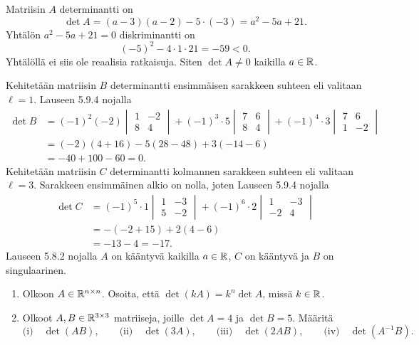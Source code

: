 \documentclass[11pt,a4paper]{amsart}
\begin{document}
\begin{solution}
  Matriisin \(A\) determinantti on
  \[
    \det A=(a-3)(a-2)-5\cdot(-3)=a^2-5a+21.
  \]
  Yhtälön \(a^2-5a+21=0\) diskriminantti on
  \[
    (-5)^2-4\cdot 1\cdot 21=-59<0.
  \]
  Yhtälöllä ei siis ole reaalisia ratkaisuja. Siten \(\det A\ne 0\)
  kaikilla \(a\in\mathbb{R}\).

  Kehitetään matriisin \(B\) determinantti ensimmäisen sarakkeen
  suhteen eli valitaan \(\ell=1\). Lauseen 5.9.4 nojalla
  \[
    \begin{aligned}
      \det B
      &= (-1)^2(-2)
      \begin{vmatrix}1 & -2 \\ 8 & 4
      \end{vmatrix}
      + (-1)^3\cdot 5
      \begin{vmatrix}7 & 6 \\ 8 & 4
      \end{vmatrix}
      + (-1)^4\cdot 3
      \begin{vmatrix}7 & 6 \\ 1 & -2
      \end{vmatrix} \\
      &= (-2)(4+16)-5(28-48)+3(-14-6) \\
      &= -40+100-60=0.
    \end{aligned}
  \]
  Kehitetään matriisin \(C\) determinantti kolmannen sarakkeen
  suhteen eli valitaan \(\ell=3\). Sarakkeen ensimmäinen alkio on
  nolla, joten Lauseen 5.9.4 nojalla
  \[
    \begin{aligned}
      \det C
      &= (-1)^5\cdot 1
      \begin{vmatrix}1 & -3 \\ 5 & -2
      \end{vmatrix}
      + (-1)^6\cdot 2
      \begin{vmatrix}1 & -3 \\ -2 & 4
      \end{vmatrix} \\
      &= -(-2+15)+2(4-6) \\
      &= -13-4=-17.
    \end{aligned}
  \]
  Lauseen 5.8.2 nojalla \(A\) on kääntyvä kaikilla \(a\in\mathbb{R}\),
  \(C\) on kääntyvä ja \(B\) on singulaarinen.
\end{solution}

\begin{exercise}
  \begin{enumerate}[label=(\alph*), leftmargin=*]
    \item Olkoon \(A\in\mathbb{R}^{n\times n}\). Osoita, että
      \(\det(kA)=k^n\det A\), missä \(k\in\mathbb{R}\).
    \item Olkoot \(A,B\in\mathbb{R}^{3\times 3}\) matriiseja, joille
      \(\det A=4\) ja \(\det B=5\). Määritä
      \[
        \text{(i)}\quad \det(AB),\qquad
        \text{(ii)}\quad \det(3A),\qquad
        \text{(iii)}\quad \det(2AB),\qquad
        \text{(iv)}\quad \det(A^{-1}B).
      \]
  \end{enumerate}
\end{exercise}
\end{document}
